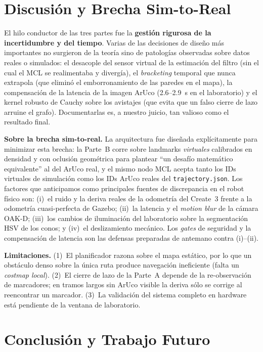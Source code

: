 \section{Discusión y Brecha Sim-to-Real}
\label{sec:conclusion}

El hilo conductor de las tres partes fue la \textbf{gestión rigurosa de la incertidumbre y del tiempo}. Varias de las decisiones de diseño más importantes no surgieron de la teoría sino de patologías observadas sobre datos reales o simulados: el desacople del sensor virtual de la estimación del filtro (sin el cual el MCL se realimentaba y divergía), el \emph{bracketing} temporal que nunca extrapola (que eliminó el emborronamiento de las paredes en el mapa), la compensación de la latencia de la imagen ArUco (2.6--2.9~s en el laboratorio) y el kernel robusto de Cauchy sobre los avistajes (que evita que un falso cierre de lazo arruine el grafo). Documentarlas es, a nuestro juicio, tan valioso como el resultado final.

\textbf{Sobre la brecha sim-to-real.} La arquitectura fue diseñada explícitamente para minimizar esta brecha: la Parte~B corre sobre landmarks \emph{virtuales} calibrados en densidad y con oclusión geométrica para plantear ``un desafío matemático equivalente'' al del ArUco real, y el mismo nodo MCL acepta tanto los IDs virtuales de simulación como los IDs ArUco reales del \texttt{trajectory.json}. Los factores que anticipamos como principales fuentes de discrepancia en el robot físico son: (i)~el ruido y la deriva reales de la odometría del Create~3 frente a la odometría cuasi-perfecta de Gazebo; (ii)~la latencia y el \emph{motion blur} de la cámara OAK-D; (iii)~los cambios de iluminación del laboratorio sobre la segmentación HSV de los conos; y (iv)~el deslizamiento mecánico. Los \emph{gates} de seguridad y la compensación de latencia son las defensas preparadas de antemano contra (i)--(ii).

\textbf{Limitaciones.} (1)~El planificador razona sobre el mapa estático, por lo que un obstáculo denso sobre la única ruta produce navegación ineficiente (falta un \emph{costmap local}). (2)~El cierre de lazo de la Parte~A depende de la re-observación de marcadores; en tramos largos sin ArUco visible la deriva sólo se corrige al reencontrar un marcador. (3)~La validación del sistema completo en hardware está pendiente de la ventana de laboratorio.

\section{Conclusión y Trabajo Futuro}

